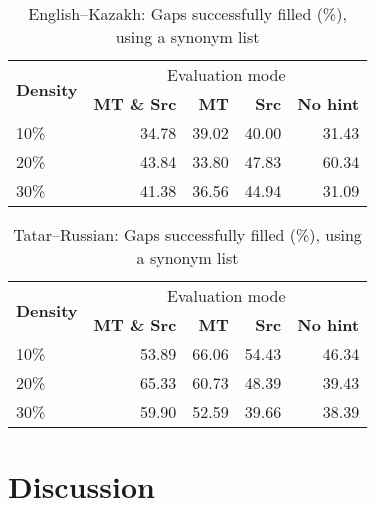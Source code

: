 \documentclass[11pt]{article}
\begin{document}
\begin{table}
  \begin{tabular}{|l|r|r|r|r|}
    \hline
    \multirow{2}{*}{\textbf{Density}} & \multicolumn{4}{|c|}{Evaluation mode} \\\cline{2-5}
                                            & \textbf{MT \& Src} & \textbf{MT} & \textbf{Src} & \textbf{No hint} \\
    10\%                                    & 34.78              & 39.02       & 40.00        & 31.43        \\
    20\%                                    & 43.84              & 33.80       & 47.83        & 60.34        \\
    30\%                                    & 41.38              & 36.56       & 44.94        & 31.09        \\
    \hline
  \end{tabular}
  \caption{English--Kazakh: Gaps successfully filled (\%), using a synonym list}
  \label{table:res-eng-kaz}
\end{table}

\begin{table}
  \begin{tabular}{|l|r|r|r|r|}
    \hline
    \multirow{2}{*}{\textbf{Density}} & \multicolumn{4}{|c|}{Evaluation mode} \\\cline{2-5}
                                            & \textbf{MT \& Src} & \textbf{MT} & \textbf{Src} & \textbf{No hint} \\
    10\%                                    & 53.89              & 66.06       & 54.43        & 46.34        \\
    20\%                                    & 65.33              & 60.73       & 48.39        & 39.43        \\
    30\%                                    & 59.90              & 52.59       & 39.66        & 38.39        \\
    \hline
  \end{tabular}
  \caption{Tatar--Russian: Gaps successfully filled (\%), using a synonym list}
  \label{table:res-tat-rus}
\end{table}



\section{Discussion}
\end{document}
